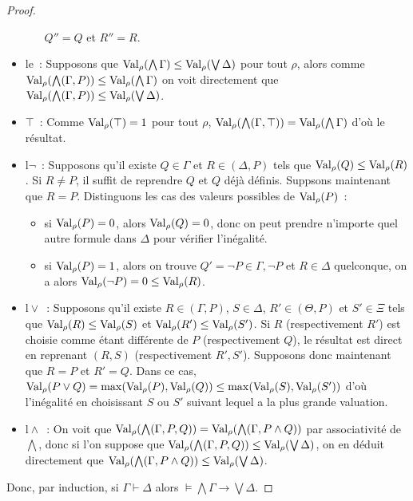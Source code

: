 \begin{proof}
\begin{itemize}
\begin{itemize}
      $Q'' = Q$ et $R'' = R$.
    \end{itemize}
  \item le~: Supposons que
    $\operatorname{Val}_\rho(\bigwedge \Gamma) \leq \operatorname{Val}_\rho(\bigvee \Delta)$ pour tout
    $\rho$, alors comme
    $\operatorname{Val}_\rho(\bigwedge (\Gamma, P)) \leq \operatorname{Val}_\rho(\bigwedge \Gamma)$ on voit
    directement que
    $\operatorname{Val}_\rho(\bigwedge(\Gamma,P)) \leq \operatorname{Val}_\rho(\bigvee\Delta)$.
  \item $\top$~: Comme $\operatorname{Val}_\rho(\top) = 1$ pour tout $\rho$,
    $\operatorname{Val}_\rho(\bigwedge(\Gamma,\top)) = \operatorname{Val}_\rho(\bigwedge \Gamma)$ d'où le
    résultat.
  \item $\mathrm l\lnot$~: Supposons qu'il existe $Q\in\Gamma$ et
    $R\in(\Delta,P)$ tels que $\operatorname{Val}_\rho(Q)\leq\operatorname{Val}_\rho(R)$. Si $R \neq P$, il
    suffit de reprendre $Q$ et $Q$ déjà définis. Suppsons maintenant que
    $R = P$. Distinguons les cas des valeurs possibles de $\operatorname{Val}_\rho(P)$~:
    \begin{itemize}
    \item si $\operatorname{Val}_\rho(P) = 0$, alors $\operatorname{Val}_\rho(Q) = 0$, donc on peut prendre
      n'importe quel autre formule dans $\Delta$ pour vérifier l'inégalité.
    \item si $\operatorname{Val}_\rho(P) = 1$, alors on trouve
      $Q' = \lnot P \in \Gamma,\lnot P$ et $R\in \Delta$ quelconque, on a alors
      $\operatorname{Val}_\rho(\lnot P) = 0 \leq \operatorname{Val}_\rho(R)$.
    \end{itemize}
  \item $\mathrm l\lor$~: Supposons qu'il existe $R\in(\Gamma,P)$, $S\in\Delta$,
    $R'\in(\Theta,P)$ et $S'\in\Xi$ tels que $\operatorname{Val}_\rho(R)\leq\operatorname{Val}_\rho(S)$ et
    $\operatorname{Val}_\rho(R')\leq\operatorname{Val}_\rho(S')$. Si $R$ (respectivement $R'$) est choisie
    comme étant différente de $P$ (respectivement $Q$), le résultat est direct
    en reprenant $(R,S)$ (respectivement $R',S'$). Supposons donc maintenant que
    $R = P$ et $R' = Q$. Dans ce cas,
    $\operatorname{Val}_\rho(P\lor Q) = \max(\operatorname{Val}_\rho(P),\operatorname{Val}_\rho(Q)) \leq \max(\operatorname{Val}_\rho(S),
    \operatorname{Val}_\rho(S'))$ d'où l'inégalité en choisissant $S$ ou $S'$ suivant lequel
    a la plus grande valuation.
  \item $\mathrm l\land$~: On voit que
    $\operatorname{Val}_\rho(\bigwedge(\Gamma,P,Q)) = \operatorname{Val}_\rho(\bigwedge(\Gamma, P \land Q))$
    par associativité de $\bigwedge$, donc si l'on suppose que
    $\operatorname{Val}_\rho(\bigwedge(\Gamma,P,Q)) \leq \operatorname{Val}_\rho(\bigvee\Delta)$, on en
    déduit directement que
    $\operatorname{Val}_\rho(\bigwedge(\Gamma,P\land Q)) \leq\operatorname{Val}_\rho(\bigvee\Delta)$.
  \end{itemize}
  Donc, par induction, si $\Gamma\vdash \Delta$ alors
  $\models \bigwedge\Gamma\to\bigvee\Delta$.
\end{proof}

